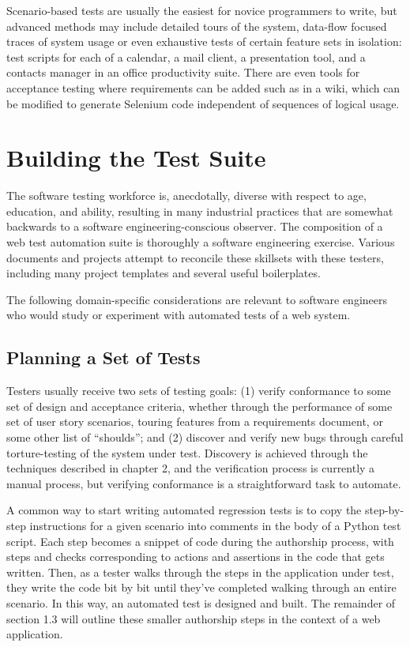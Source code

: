 Scenario-based tests are usually the easiest for novice programmers to write, but advanced methods may include detailed tours of the system, data-flow focused traces of system usage\citep{liu2000object} or even exhaustive tests of certain feature sets in isolation: test scripts for each of a calendar, a mail client, a presentation tool, and a contacts manager in an office productivity suite. There are even tools for acceptance testing where requirements can be added such as in a wiki, which can be modified to generate Selenium code independent of sequences of logical usage.\citep{wang2009build}

\section{Building the Test Suite}
The software testing workforce is, anecdotally, diverse with respect to age, education, and ability, resulting in many industrial practices that are somewhat backwards to a software engineering-conscious observer. The composition of a web test automation suite is thoroughly a software engineering exercise. Various documents and projects attempt to reconcile these skillsets with these testers, including many project templates and several useful boilerplates. \citep{GitHubma29}

The following domain-specific considerations are relevant to software engineers who would study or experiment with automated tests of a web system.

\subsection{Planning a Set of Tests}
Testers usually receive two sets of testing goals: (1) verify conformance to some set of design and acceptance criteria, whether through the performance of some set of user story scenarios, touring features from a requirements document, or some other list of ``shoulds''; and (2) discover and verify new bugs through careful torture-testing of the system under test. Discovery is achieved through the techniques described in chapter 2, and the verification process is currently a manual process, but verifying conformance is a straightforward task to automate.

A common way to start writing automated regression tests is to copy the step-by-step instructions for a given scenario into comments in the body of a Python test script. Each step becomes a snippet of code during the authorship process, with steps and checks corresponding to actions and assertions in the code that gets written. Then, as a tester walks through the steps in the application under test, they write the code bit by bit until they've completed walking through an entire scenario. In this way, an automated test is designed and built.\citep{nguyen2001testing} The remainder of section 1.3 will outline these smaller authorship steps in the context of a web application.

